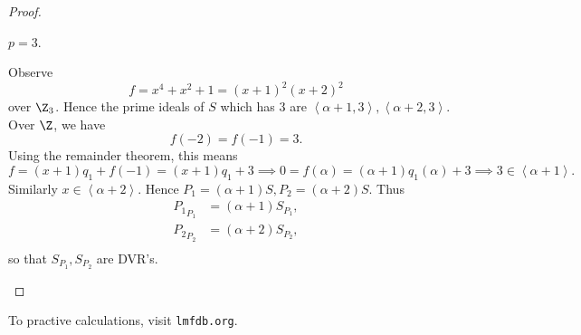 \documentclass[pmath441]{subfiles}
\begin{document}
\begin{proof}
        \begin{case}
            $p=3$. 

            Observe
            \begin{equation*}
                f = x^{4}+x^{2}+1 = \left( x+1 \right)^{2}\left( x+2 \right)^{2}
            \end{equation*}
            over $\Z_3$. Hence the prime ideals of $S$ which has $3$ are $\left< \alpha+1,3 \right>,\left< \alpha+2,3 \right>$. Over $\Z$, we have
            \begin{equation*}
                f\left( -2 \right) = f\left( -1 \right) = 3.
            \end{equation*}
            Using the remainder theorem, this means
            \begin{equation*}
                f = \left( x+1 \right)q_1+f\left( -1 \right) = \left( x+1 \right)q_1+3 \implies 0 = f\left( \alpha \right) = \left( \alpha+1 \right)q_1\left( \alpha \right)+3 \implies 3\in\left< \alpha+1 \right>. 
            \end{equation*}
            Similarly $x\in\left< \alpha+2 \right>$. Hence $P_1 = \left( \alpha+1 \right)S, P_2=\left( \alpha+2 \right)S$. Thus
            \begin{equation*}
                \begin{aligned}
                    {P_1}_{P_1} & = \left( \alpha+1 \right)S_{P_1}, \\
                    {P_2}_{P_2} & = \left( \alpha+2 \right)S_{P_2}, \\
                \end{aligned} 
            \end{equation*}
            so that $S_{P_1},S_{P_2}$ are DVR's.
        \end{case}
        
        \noindent
        \begin{minipage}{\textwidth}
        \end{minipage}
    \end{proof}

    \np To practive calculations, visit \texttt{lmfdb.org}.
    
\end{document}
